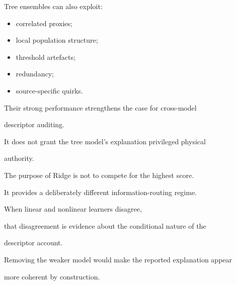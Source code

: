 \documentclass[11pt,a4paper,oneside]{report}
\begin{document}
Tree ensembles can also exploit:



\begin{itemize}



\item

correlated proxies;



\item

local population structure;



\item

threshold artefacts;



\item

redundancy;



\item

source-specific quirks.



\end{itemize}



Their strong performance strengthens the case for cross-model

descriptor auditing.



It does not grant the tree model's explanation privileged physical

authority.





\begin{reviewerquestion}



The purpose of Ridge is not to compete for the highest score.



It provides a deliberately different information-routing regime.



When linear and nonlinear learners disagree,

that disagreement is evidence about the conditional nature of the

descriptor account.



Removing the weaker model would make the reported explanation appear

more coherent by construction.



\end{reviewerquestion}
\end{document}
